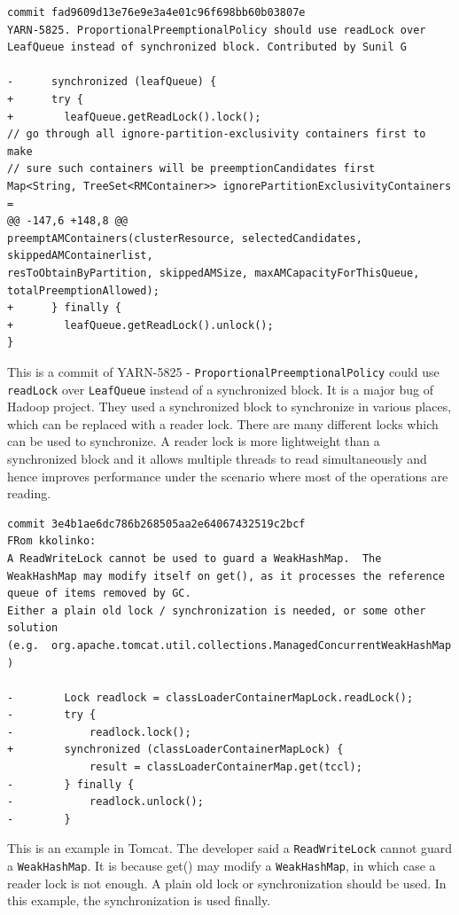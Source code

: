 \documentclass[conference]{IEEEtran}
\begin{document}
\begin{lstlisting}
commit fad9609d13e76e9e3a4e01c96f698bb60b03807e
YARN-5825. ProportionalPreemptionalPolicy should use readLock over LeafQueue instead of synchronized block. Contributed by Sunil G

-      synchronized (leafQueue) {
+      try {
+        leafQueue.getReadLock().lock();
// go through all ignore-partition-exclusivity containers first to make
// sure such containers will be preemptionCandidates first
Map<String, TreeSet<RMContainer>> ignorePartitionExclusivityContainers =
@@ -147,6 +148,8 @@
preemptAMContainers(clusterResource, selectedCandidates, skippedAMContainerlist,
resToObtainByPartition, skippedAMSize, maxAMCapacityForThisQueue,
totalPreemptionAllowed);
+      } finally {
+        leafQueue.getReadLock().unlock();
}
\end{lstlisting}

This is a commit of YARN-5825 - \texttt{ProportionalPreemptionalPolicy} could use \texttt{readLock} over \texttt{LeafQueue} instead of a synchronized block. It is a major bug of Hadoop project. They used a synchronized block to synchronize in various places, which can be replaced with a reader lock. There are many different locks which can be used to synchronize. A reader lock is more lightweight than a synchronized block and it allows multiple threads to read simultaneously and hence improves performance under the scenario where most of the operations are reading.

\begin{lstlisting}
commit 3e4b1ae6dc786b268505aa2e64067432519c2bcf
FRom kkolinko:
A ReadWriteLock cannot be used to guard a WeakHashMap.  The
WeakHashMap may modify itself on get(), as it processes the reference
queue of items removed by GC.
Either a plain old lock / synchronization is needed, or some other solution
(e.g.  org.apache.tomcat.util.collections.ManagedConcurrentWeakHashMap )

-        Lock readlock = classLoaderContainerMapLock.readLock();
-        try {
-            readlock.lock();
+        synchronized (classLoaderContainerMapLock) {
             result = classLoaderContainerMap.get(tccl);
-        } finally {
-            readlock.unlock();
-        }
\end{lstlisting}

This is an example in Tomcat. The developer said a \texttt{ReadWriteLock} cannot guard a \texttt{WeakHashMap}. It is because get() may modify a \texttt{WeakHashMap}, in which case a reader lock is not enough. A plain old lock or synchronization should be used. In this example, the synchronization is used finally.
\end{document}
